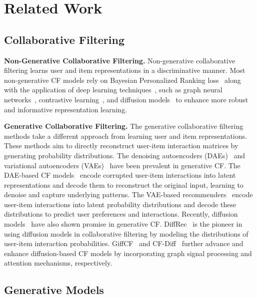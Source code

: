 \section{Related Work}
\subsection{Collaborative Filtering}

\noindent \textbf{Non-Generative Collaborative Filtering.}
Non-generative collaborative filtering learns user and item representations in a discriminative manner. Most non-generative CF models rely on Bayesian Personalized Ranking loss~\cite{rendle2012bpr} along with the application of deep learning techniques~\cite{he2017neural}, such as graph neural networks~\cite{wang2019neural, he2020lightgcn}, contrastive learning~\cite{wujc2021self, lin2022improving, yu2022graph, liu2024twincl}, and diffusion models~\cite{zhao2024denoising, yi2024directional} to enhance more robust and informative representation learning.

\noindent \textbf{Generative Collaborative Filtering.}
The generative collaborative filtering methods take a different approach from learning user and item representations. These methods aim to directly reconstruct user-item interaction matrices by generating probability distributions. The denoising autoencoders (DAEs)~\cite{vincent2008extracting, bengio2013generalized} and variational autoencoders (VAEs)~\cite{kingma2013auto} have been prevalent in generative CF. The DAE-based CF models~\cite{wu2016collaborative, liang2018variational} encode corrupted user-item interactions into latent representations and decode them to reconstruct the original input, learning to denoise and capture underlying patterns. The VAE-based recommenders~\cite{liang2018variational, ma2019learning, shenbin2020recvae} encode user-item interactions into latent probability distributions and decode these distributions to predict user preferences and interactions.
Recently, diffusion models~\cite{lin2024survey} have also shown promise in generative CF. DiffRec~\cite{wang2023diffusion} is the pioneer in using diffusion models in collaborative filtering by modeling the distributions of user-item interaction probabilities. GiffCF~\cite{zhu2024graph} and CF-Diff~\cite{hou2024collaborative} further advance and enhance diffusion-based CF models by incorporating graph signal processing and attention mechanisms, respectively.

\vspace{-3pt}
\subsection{Generative Models}

